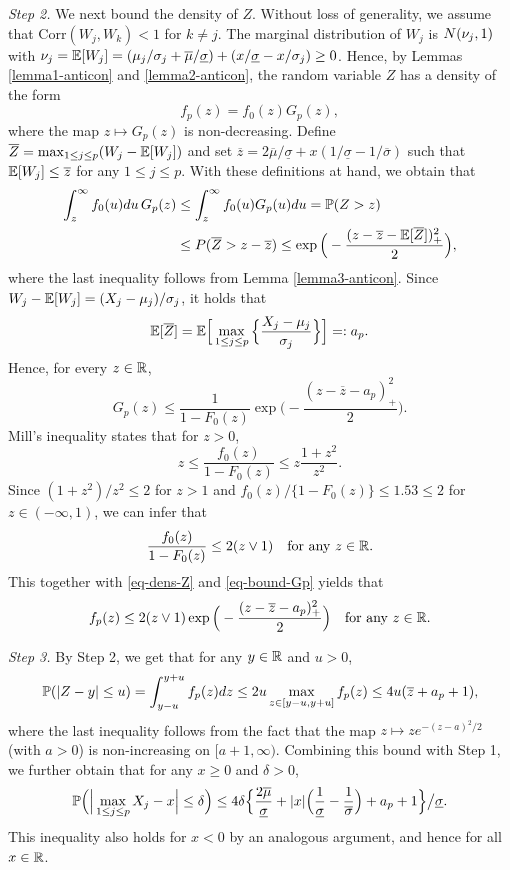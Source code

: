 \textit{Step 2.} We next bound the density of $Z$. Without loss of generality, we assume that $\text{Corr}(W_j,W_k) < 1$ for $k \ne j$. The marginal distribution of $W_j$ is $N(\nu_j,1)$ with $\nu_j = \mathbb{E}[W_j] = (\mu_j/\sigma_j + \overline{\mu}/{\underline{\sigma}}) + (x/\underline{\sigma} - x/\sigma_j) \ge 0$. Hence, by Lemmas \ref{lemma1-anticon} and \ref{lemma2-anticon}, the random variable $Z$ has a density of the form
\begin{equation}\label{eq-dens-Z}
f_p(z) = f_0(z) G_p(z), 
\end{equation}
where the map $z \mapsto G_p(z)$ is non-decreasing. Define $\overline{Z} = \max_{1 \le j \le p} (W_j - \mathbb{E}[W_j])$ and set $\overline{z} = 2 \overline{\mu}/\underline{\sigma} + x(1/\underline{\sigma} - 1/\overline{\sigma})$ such that $\mathbb{E}[W_j] \le \overline{z}$ for any $1 \le j \le p$. With these definitions at hand, we obtain that  
\begin{align*}
\int_z^{\infty} f_0(u)du \, G_p(z) & \le \int_z^{\infty} f_0(u) G_p(u) du = \mathbb{P}(Z > z) \\ 
 & \le P(\overline{Z} > z - \overline{z}) \le \exp \Big( - \frac{(z - \overline{z} - \mathbb{E}[\overline{Z}])^2_+}{2} \Big), 
\end{align*}
where the last inequality follows from Lemma \ref{lemma3-anticon}. Since $W_j - \mathbb{E}[W_j] = (X_j - \mu_j)/\sigma_j$, it holds that 
\[ \mathbb{E}[\overline{Z}] = \mathbb{E} \Big[ \max_{1 \le j \le p} \Big\{ \frac{X_j-\mu_j}{\sigma_j} \Big\} \Big] =: a_p. \]
Hence, for every $z \in \mathbb{R}$, 
\begin{equation}\label{eq-bound-Gp}
G_p(z) \le \frac{1}{1 - F_0(z)} \exp\Big( - \frac{(z - \overline{z} - a_p)_+^2}{2} \Big). 
\end{equation}
Mill's inequality states that for $z > 0$, 
\[ z \le \frac{f_0(z)}{1-F_0(z)} \le z \frac{1+z^2}{z^2}. \]
Since $(1+z^2)/z^2 \le 2$ for $z > 1$ and $f_0(z)/\{1-F_0(z)\} \le 1.53 \le 2$ for $z \in (-\infty,1)$, we can infer that
\[ \frac{f_0(z)}{1-F_0(z)} \le 2 (z \vee 1) \quad \text{for any } z \in \mathbb{R}. \]
This together with \eqref{eq-dens-Z} and \eqref{eq-bound-Gp} yields that
\[ f_p(z) \le 2 (z \vee 1)  \exp\Big( - \frac{(z - \overline{z} - a_p)_+^2}{2} \Big) \quad \text{for any } z \in \mathbb{R}. \]
 

\textit{Step 3.} By Step 2, we get that for any $y \in \mathbb{R}$ and $u > 0$, 
\[ \mathbb{P}( |Z - y| \le u) = \int_{y - u}^{y + u} f_p(z) dz \le 2u \max_{z \in [y-u,y+u]} f_p(z) \le 4u (\overline{z} + a_p + 1), \] 
where the last inequality follows from the fact that the map $z \mapsto z e^{-(z-a)^2/2}$ (with $a > 0$) is non-increasing on $[a+1,\infty)$. Combining this bound with Step 1, we further obtain that for any $x \ge 0$ and $\delta > 0$, 
\begin{equation}\label{eq-bound1-Levy}
\mathbb{P} \Big( \Big| \max_{1 \le j \le p} X_j - x \Big| \le \delta \Big) \le 4\delta \Big\{ \frac{2\overline{\mu}}{\underline{\sigma}} + |x| \Big(\frac{1}{\underline{\sigma}} - \frac{1}{\overline{\sigma}}\Big) + a_p + 1 \Big\} \big/ \underline{\sigma}. 
\end{equation} 
This inequality also holds for $x < 0$ by an analogous argument, and hence for all $x \in \mathbb{R}$. 


